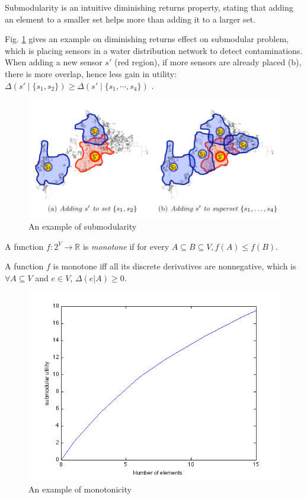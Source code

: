 \documentclass[12pt]{article}
\begin{document}
Submodularity is an intuitive diminishing returns property, stating that adding an element to a smaller set helps more than adding it to a larger set. 

Fig. \ref{fig:Submodular} gives an example on diminishing returns effect on submodular problem, which is placing sensors in a water distribution network to detect contaminations. When adding a new sensor $ s' $ (red region), if more sensors are already placed (b), there is more overlap, hence less gain in utility: $ \Delta( s' \mid \{s_{1}, s_{2} \} ) \geq \Delta ( s' \mid \{ s_{1}, \cdots , s_{4} \} ) $ .

\begin{figure}[H]
\centering
\includegraphics[width=0.7\linewidth]{./Submodular}
\caption{An example of submodularity}
\label{fig:Submodular}
\end{figure}


\begin{mydef}
A function $ f: 2^{V} \rightarrow \mathbb{R} $ is \emph{monotone} if for every $ A \subseteq B \subseteq V, f(A) \leq f(B) $.
\end{mydef}

A function $ f $ is monotone iff all its discrete derivatives are nonnegative, which is 
$ \forall A \subseteq V $ and $ e \in V $, $ \Delta (e|A) \geq 0 $.

\begin{figure}[H]
\centering
\includegraphics[width=0.45\linewidth]{./monotone}
\caption{An example of monotonicity}
\label{fig:monotone}
\end{figure}
\end{document}
